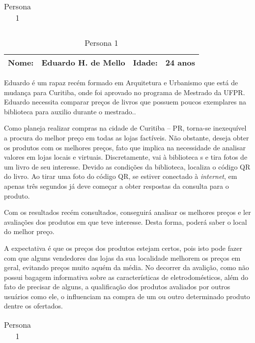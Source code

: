 \par \noindent
\begin{table}[!ht] 
    \begin{tabularx}{\textwidth}{c}
        \toprule
    \end{tabularx}
    
    \begin{tabularx}{\textwidth}{p{}p{}
                                 p{}p{}}
        \textbf{Nome:} & Eduardo H. de Mello
        & \textbf{Idade:} & 24 anos \\
    \midrule
    \end{tabularx}
    
    \hspace*{1cm}Eduardo é um rapaz recém formado em Arquitetura e Urbanismo que está de 
mudança para Curitiba, onde foi aprovado no programa de Mestrado da UFPR.
Eduardo necessita comparar preços de livros que possuem poucos exemplares na biblioteca para auxilio durante o mestrado..

\hspace*{1cm}Como planeja realizar compras na cidade de Curitiba -- PR, 
torna-se inexequível a procura do melhor preço em todas as lojas factíveis. 
Não obstante, deseja obter os produtos com os melhores preços, fato que
implica na necessidade de analisar valores em lojas locais e virtuais.
Discretamente, vai à biblioteca s e tira fotos de um
livro de  seu interesse.
Devido as condições da biblioteca,
localiza o código QR do livro.
Ao tirar uma foto do código QR, se estiver conectado à \textit{internet},
em apenas três segundos já deve começar a obter respostas da consulta
para o produto.

\hspace*{1cm}Com os resultados recém consultados, conseguirá analisar os melhores
preços e ler avaliações dos produtos em que teve interesse.  Desta forma, 
poderá saber o local do melhor preço.

\hspace*{1cm}A expectativa é que os preços dos produtos estejam certos, pois isto pode 
fazer com que alguns vendedores das lojas da sua localidade melhorem os preços
em geral, evitando preços muito aquém da média. No decorrer da avalição, como não possui bagagem informativa
sobre as características de eletrodomésticos, além do fato de 
precisar de alguns, a qualificação dos produtos avaliados por outros usuários
como ele, o influenciam na compra de um ou outro determinado produto dentre os
ofertados.
    
    \begin{tabularx}{\textwidth}{c}
        \bottomrule
    \end{tabularx}
    
    \caption{ \label{Persona1} Persona 1}
\end{table}


